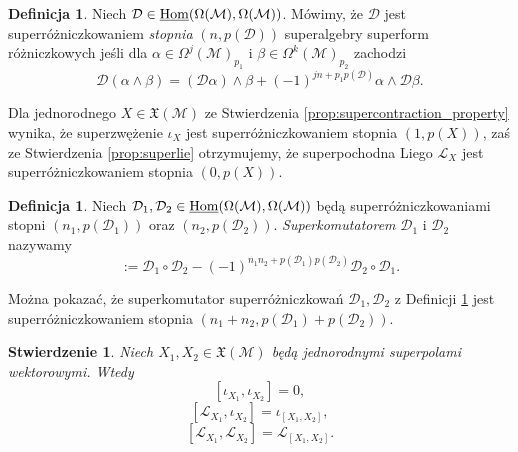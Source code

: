 \documentclass[11pt,a4paper]{report}
\newtheorem{proposition}[theorem]{Stwierdzenie}
\theoremstyle{definition}
\newtheorem{definition}[theorem]{Definicja}
\begin{document}
\begin{definition}
	Niech $\mathcal{D} \in \underline{\rm Hom}(\Omega(\mathcal{M}),\Omega(\mathcal{M}))$. Mówimy, że $\mathcal D$ jest superróżniczkowaniem \textit{stopnia} $(n,p(\mathcal{D}))$ superalgebry superform różniczkowych jeśli dla $\alpha \in \Omega^j (\mathcal{M})_{p_1}\!$ i $\beta\in \Omega^k (\mathcal{M})_{p_2}$ zachodzi
	\begin{equation*}
		\mathcal D(\alpha\wedge \beta)=(\mathcal D\alpha)\wedge \beta+(-1)^{jn+p_1 p(\mathcal D)} \alpha\wedge \mathcal D\beta.
	\end{equation*}
\end{definition}
			      				
Dla jednorodnego $X \in \mathfrak X(\mathcal{M})$ ze Stwierdzenia \ref{prop:supercontraction_property} wynika, że superzwężenie $\iota_X$ jest superróżniczkowaniem stopnia $(1,p(X))$, zaś ze Stwierdzenia \ref{prop:superlie} otrzymujemy, że superpochodna Liego $\mathcal{L}_X$ jest superróżniczkowaniem stopnia $(0, p(X))$.
			      				
\begin{definition}
	\label{def:supercommutator}
	Niech $\mathcal{D}_1, \mathcal D_2 \in \underline{\rm Hom}(\Omega(\mathcal{M}),\Omega(\mathcal{M}))$ będą superróżniczkowaniami stopni $(n_1,p(\mathcal{D}_1))$ oraz $(n_2 ,p(\mathcal{D}_2))$. \textit{Superkomutatorem} $\mathcal{D}_1$ i $\mathcal D_2$ nazywamy
	\begin{equation*}
		[\mathcal D_1,\mathcal D_2] := \mathcal D_1\circ \mathcal D_2-(-1)^{n_1n_2+p(\mathcal{D}_1) p(\mathcal{D}_2)} \mathcal D_2\circ \mathcal D_1.
	\end{equation*}
\end{definition}
			      				
Można pokazać, że superkomutator superróżniczkowań $\mathcal{D}_1, \mathcal D_2$ z Definicji \ref{def:supercommutator} jest superróżniczkowaniem stopnia $(n_1 + n_2, p(\mathcal D_1) + p(\mathcal D_2))$.
			      				
\begin{proposition}
	Niech $X_1, X_2 \in \mathfrak X (\mathcal M)$ będą jednorodnymi superpolami wektorowymi. Wtedy 
	\begin{equation}
		\label{eq:supcom_supcon}
		[\iota_{X_1},\iota_{X_2}] = 0,
	\end{equation}
	\begin{equation} 
		\label{eq:supcom_suplie_supcon}
		[\mathcal{L}_{X_1},\iota_{X_2}] = \iota_{[X_1,X_2]},
	\end{equation}
	\begin{equation}
		\label{eq:supcom_supliex2}
		[\mathcal{L}_{X_1},\mathcal{L}_{X_2}]=\mathcal{L}_{[X_1,X_2]}.
	\end{equation}
\end{proposition}
			      				
\end{document}
